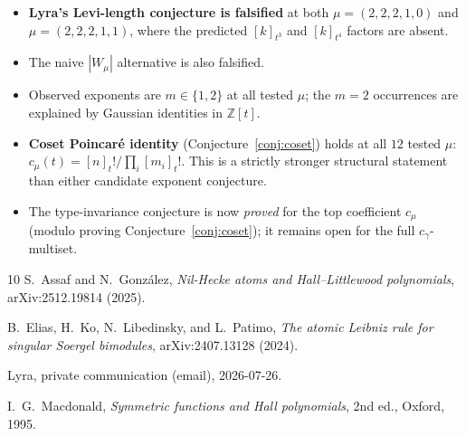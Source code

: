 \documentclass[11pt,letterpaper]{amsart}
\theoremstyle{definition}
\theoremstyle{remark}
\begin{document}
\begin{itemize}
\item \textbf{Lyra's Levi-length conjecture is falsified} at both
  $\mu = (2,2,2,1,0)$ and $\mu = (2,2,2,1,1)$, where the predicted
  $[k]_{t^3}$ and $[k]_{t^4}$ factors are absent.
\item The naive $|W_\mu|$ alternative is also falsified.
\item Observed exponents are $m \in \{1, 2\}$ at all tested $\mu$;
  the $m = 2$ occurrences are explained by Gaussian identities in
  $\mathbb{Z}[t]$.
\item \textbf{Coset Poincar\'e identity} (Conjecture~\ref{conj:coset})
  holds at all $12$ tested $\mu$: $c_\mu(t) = [n]_t! / \prod_i [m_i]_t!$.
  This is a strictly stronger structural statement than either
  candidate exponent conjecture.
\item The type-invariance conjecture is now \emph{proved} for the top
  coefficient $c_\mu$ (modulo proving Conjecture~\ref{conj:coset});
  it remains open for the full $c_\gamma$-multiset.
\end{itemize}

\begin{thebibliography}{10}
S.~Assaf and N.~Gonz\'alez, \emph{Nil-Hecke atoms and Hall--Littlewood
polynomials}, arXiv:2512.19814 (2025).

B.~Elias, H.~Ko, N.~Libedinsky, and L.~Patimo, \emph{The atomic Leibniz
rule for singular Soergel bimodules}, arXiv:2407.13128 (2024).

Lyra, private communication (email), 2026-07-26.

I.~G.~Macdonald, \emph{Symmetric functions and Hall polynomials},
2nd ed., Oxford, 1995.
\end{thebibliography}
\end{document}
